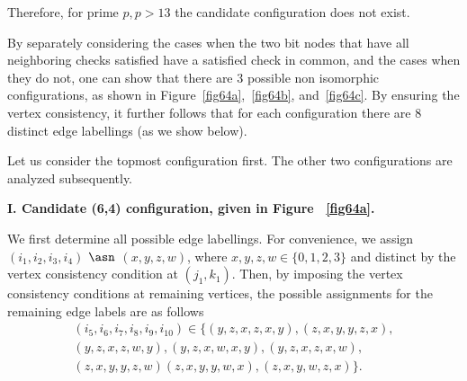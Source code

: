 Therefore, for prime $p, p>13$ the candidate configuration does
not exist.

By separately considering the cases when the two bit nodes that
have all neighboring checks satisfied have a satisfied check in
common, and the cases when they do not, one can show that there
are 3 possible non isomorphic configurations, as shown in
Figure~\ref{fig64a},~\ref{fig64b}, and~\ref{fig64c}. By ensuring
the vertex consistency, it further follows that for each
configuration there are 8 distinct edge labellings (as we show
below).

Let us consider the topmost configuration first. The other two
configurations are analyzed subsequently.

\textbf{I. Candidate (6,4) configuration, given in Figure
~\ref{fig64a}.}


We first determine all possible edge labellings. For convenience,
we assign $(i_1,i_2,i_3,i_4)$ $\asn$ $(x,y,z,w)$, where $x,y,z,w
\in \{0,1,2,3 \}$ and distinct by the vertex consistency condition
at $(j_1,k_1)$. Then, by imposing the vertex consistency
conditions at remaining vertices, the possible assignments for the
remaining edge labels are as follows
\begin{equation}\label{tuples}\begin{array}{cccccc} (i_5,i_6,i_7,i_8,i_9,i_{10}) \in
 \{(y,z,x,z,x,y), (z,x,y,y,z,x),  \\
 (y,z,x,z,w,y),
(y,z,x,w,x,y),  (y,z,x,z,x,w),\\(z,x,y,y,z,w)
(z,x,y,y,w,x),(z,x,y,w,z,x) \}. \end{array}\end{equation}

